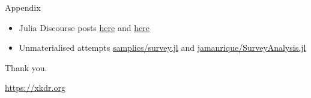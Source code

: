 \documentclass{beamer}          %
\begin{document}
\appendix

\begin{frame}[label=appendix_end]{Appendix}
  \begin{itemize}
  	\item Julia Discourse posts \href{https://discourse.julialang.org/t/any-package-for-survey-data-analysis/67317}{here} and \href{https://discourse.julialang.org/t/analysis-of-complex-surveys-in-julia/44011}{here}
  	\item Unmaterialised attempts \href{https://github.com/samplics-org/survey.jl}{samplics/survey.jl} and \href{https://github.com/jamanrique/SurveyAnalysis.jl}{jamanrique/SurveyAnalysis.jl}
  \end{itemize}
\end{frame}

\begin{frame}
  \hfill {\LARGE Thank you}.

  \vfill
  \vfill

  \hfill \url{https://xkdr.org}
\end{frame}
\end{document}
